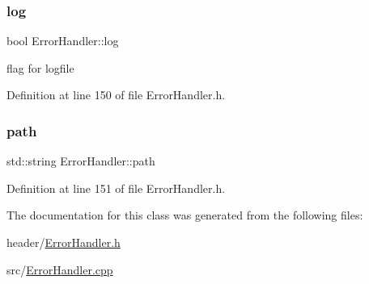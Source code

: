 \subsubsection{\texorpdfstring{log}{log}}
{\footnotesize\ttfamily bool Error\+Handler\+::log\hspace{0.3cm}{\ttfamily [private]}}

flag for logfile 

Definition at line 150 of file Error\+Handler.\+h.

\mbox{\label{classErrorHandler_aeabbc987b7eaa01b6d006b55b4e00574}} 
\subsubsection{\texorpdfstring{path}{path}}
{\footnotesize\ttfamily std\+::string Error\+Handler\+::path\hspace{0.3cm}{\ttfamily [private]}}



Definition at line 151 of file Error\+Handler.\+h.



The documentation for this class was generated from the following files\+:\begin{DoxyCompactItemize}
\item 
header/\mbox{\hyperlink{ErrorHandler_8h}{Error\+Handler.\+h}}\item 
src/\mbox{\hyperlink{ErrorHandler_8cpp}{Error\+Handler.\+cpp}}\end{DoxyCompactItemize}
